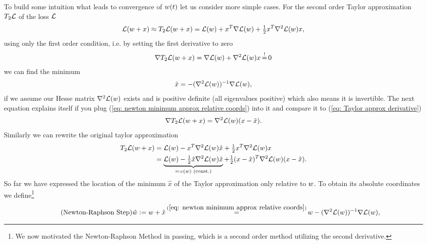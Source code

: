 To build some intuition what leads to convergence of \(w(t)\) let us
consider more simple cases. For the second order Taylor approximation
\(T_2\mathcal{L}\) of the loss \(\mathcal{L}\)
%
\begin{align*}
	\mathcal{L}(w+x) \approx T_2\mathcal{L}(w+x)
	= \mathcal{L}(w) + x^T \nabla \mathcal{L}(w) + \tfrac12 x^T \nabla^2 \mathcal{L}(w) x,
\end{align*}
%
using only the first order condition, i.e. by setting the first derivative to zero
%
\begin{align}\label{eq: Taylor approx derivative}
	\nabla T_2\Loss(\weights+x) = \nabla \Loss(\weights) + \nabla^2\Loss(\weights) x \xeq{!} 0
\end{align}
%
we can find the minimum 
%
\begin{align}\label{eq: newton minimum approx relative coords}
	\hat{x} = -(\nabla^2 \mathcal{L}(w))^{-1}\nabla \mathcal{L}(w),
\end{align}
%
if we assume our Hesse matrix \(\nabla^2 \mathcal{L}(w)\) exists and is
positive definite (all eigenvalues positive) which also means it is invertible.
The next equation explains itself if you plug (\ref{eq: newton minimum approx
relative coords}) into it and compare it to (\ref{eq: Taylor approx derivative})
%
\begin{align*}
	\nabla T_2\mathcal{L}(w+x) = \nabla^2 \mathcal{L}(w)(x-\hat{x}).
\end{align*}
%
Similarly we can rewrite the original taylor approximation
%
\begin{align*}
	T_2\mathcal{L}(w+x)
	&= \mathcal{L}(w) - x^T \nabla^2 \mathcal{L}(w) \hat{x} + \tfrac12 x^T \nabla^2 \mathcal{L}(w) x \\
	&= \underbrace{
		\mathcal{L}(w) - \tfrac12 \hat{x} \nabla^2 \mathcal{L}(w) \hat{x}
	}_{
		=: c(w) \text{ (const.)}
	} + \tfrac12 (x-\hat{x})^T \nabla^2 \mathcal{L}(w)(x-\hat{x}).
\end{align*}
%
So far we have expressed the location of the minimum \(\hat{x}\) of the Taylor
approximation only relative to \(w\). To obtain its absolute coordinates
we define\footnote{We now motivated the Newton-Raphson Method in passing, which is
a second order method utilizing the second derivative.}
%
\begin{align}\label{eq: newton minimum approx}
	\tag{Newton-Raphson Step}
	\hat{\weights} := \weights + \hat{x}
	\xeq{(\ref{eq: newton minimum approx relative coords})}
	\weights -(\nabla^2 \Loss(\weights))^{-1}\nabla \Loss(\weights),
\end{align}
